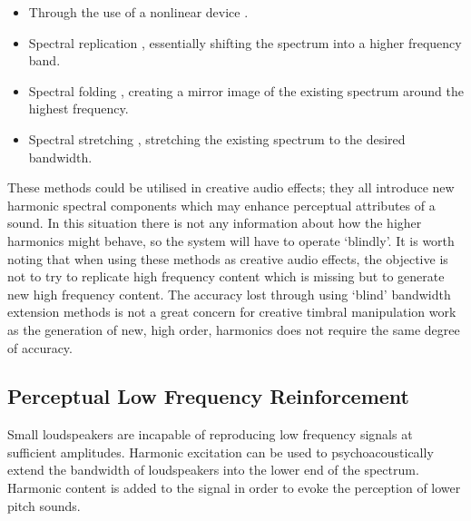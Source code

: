 		\begin{itemize}
			\item Through the use of a nonlinear device \citep{larsen2002efficient, sha2010high}.
			\item Spectral replication \citep{nagel2010a}, essentially shifting the spectrum into a higher
			      frequency band.
			\item Spectral folding \citep{friedrich2007spectral}, creating a mirror image of the existing
			      spectrum around the highest frequency.
			\item Spectral stretching \citep{nagel2009a}, stretching the existing spectrum to the desired
			      bandwidth.
		\end{itemize}

		These methods could be utilised in creative audio effects; they all introduce new harmonic spectral
		components which may enhance perceptual attributes of a sound. In this situation there is not any
		information about how the higher harmonics might behave, so the system will have to operate `blindly'. It
		is worth noting that when using these methods as creative audio effects, the objective is not to try to
		replicate high frequency content which is missing but to generate new high frequency content. The accuracy
		lost through using `blind' bandwidth extension methods is not a great concern for creative timbral
		manipulation work as the generation of new, high order, harmonics does not require the same degree of
		accuracy.

	\subsection{Perceptual Low Frequency Reinforcement}
	\label{sec:Excitation-Uses-Reinforcement}
		Small loudspeakers are incapable of reproducing low frequency signals at sufficient amplitudes. Harmonic
		excitation can be used to psychoacoustically extend the bandwidth of loudspeakers into the lower end of the
		spectrum. Harmonic content is added to the signal in order to evoke the perception of lower pitch sounds.
		
